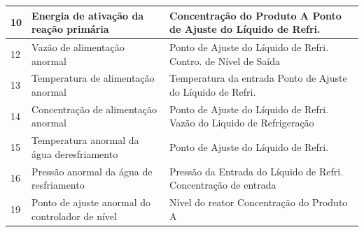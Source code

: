 \documentclass[
	12pt,				%
	openright,			%
	oneside,			%
	a4paper,			%
	english,			%
	french,				%
	spanish,			%
	brazil				%
	]{abntex2}
\begin{document}
\begin{apendicesenv}
\begin{table}[!htbp]
\begin{tabularx}{\textwidth}{|l|X|X|}
      10                   & Energia de ativação da reação primária                              & Concentração do Produto A \newline Ponto de Ajuste do Líquido de Refri.               \\\hline
      12                   & Vazão de alimentação anormal                                        & Ponto de Ajuste do Líquido de Refri. \newline Contro. de Nível de Saída               \\\hline
      13                   & Temperatura de alimentação anormal                                  & Temperatura da entrada \newline Ponto de Ajuste do Líquido de Refri.                  \\\hline
      14                   & Concentração de alimentação anormal                                 & Ponto de Ajuste do Líquido de Refri. \newline Vazão do Liquido de Refrigeração        \\\hline
      15                   & Temperatura anormal da água de\newline resfriamento                 & Ponto de Ajuste do Líquido de Refri.                                                  \\\hline
      16                   & Pressão anormal da água de resfriamento                             & Pressão da Entrada do Líquido de Refri. \newline Concentração de entrada              \\\hline
      19                   & Ponto de ajuste anormal do controlador de nível                     & Nível do reator \newline Concentração do Produto A                                    \\\hline
    \end{tabularx}
    \label{tbl-failure-feature-cstr}
  \end{table}


\end{apendicesenv}
\end{document}
